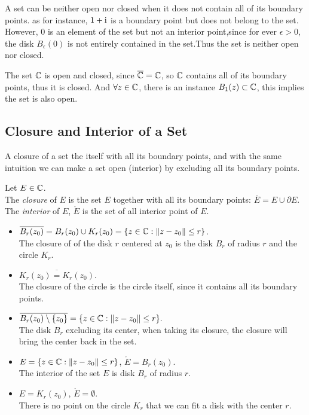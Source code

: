 \documentclass{caesar_book}
\begin{document}
A set can be neither open nor closed when it does not contain all of its
boundary points. as for instance, $1+\rm{i}$ is a boundary point but does not
belong to the set. However, $0$ is an element of the set but not an interior
point,since for ever $\epsilon > 0$, the disk  $B_{\epsilon}(0)$ is not
entirely contained in the set.Thus the set is neither open nor closed. 

The set ${\mathbb{C}}$ is open and closed, since  $\overline{{\mathbb{C}}}={\mathbb{C}}$, so ${\mathbb{C}}$ contains all of
its boundary points, thus it is closed. And $\forall z \in {\mathbb{C}}$, there is an
instance $B_1(z) \subset {\mathbb{C}}$, this implies the set is also open.

\subsection{Closure and Interior of a Set}
A closure of a set the itself with all its boundary points, and with the same intuition we can make a set open (interior) by excluding all its boundary points.
\begin{definition}
    Let $E \in {\mathbb{C}}$.\\
    The \emph{closure} of $E$ is the set  $E$ together with all its boundary points: $\overline{E} = E \cup \partial E$.
The \emph{interior} of $E$,  $\mathring{E}$ is the set of all interior point of $E$.
\end{definition}

\begin{texample}
    \begin{itemize}
        \item $\overline{B_r(z_0)} = B_r(z_0) \cup K_r(z_0) = \{z \in {\mathbb{C}}:
            \|z-z_0\| \le r\}  $.\\
            The closure of of the disk $r$ centered at  $z_0$ is the disk $B_r$
            of radius  $r$ and the circle $K_r$.
        \item $\overline{K_r(z_0)=K_r(z_0)}$.\\
            The closure of the circle is the circle itself, since it contains
            all its boundary points.
        \item $\overline{B_r(z_0) \setminus  \{z_0\} } = \{z \in {\mathbb{C}} :
            \|z-z_0\| \le r\}. $\\
            The disk $B_r$ excluding its center, when taking its closure, the
            closure will bring the center back in the set. 
        \item $E=\{z \in {\mathbb{C}} : \|z-z_0\| \le r\} $, $\mathring{E}=B_r(z_0)$.\\
            The interior of the set  $E$ is disk  $B_r$ of radius  $r$.
        \item  $E = K_r(z_0)$,  $\mathring{E} = \emptyset$.\\            There is no point on the circle  $K_r$ that we can fit a disk with the center  $r$.
    \end{itemize} 
\end{texample}
\end{document}
